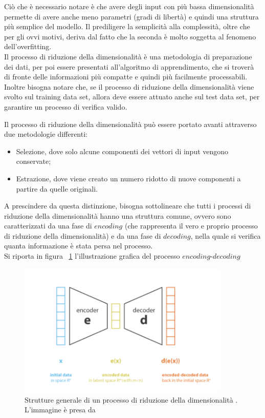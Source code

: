Ciò che è necessario notare è che avere degli input con più bassa dimensionalità permette di avere anche meno parametri (gradi di libertà) e quindi una struttura più semplice del modello. Il prediligere la semplicità alla complessità, oltre che per gli ovvi motivi, deriva dal fatto che la seconda è molto soggetta al fenomeno dell'overfitting. \\
Il processo di riduzione della dimensionalità è una metodologia di preparazione dei dati, per poi essere presentati all'algoritmo di apprendimento, che si troverà di fronte delle informazioni più compatte e quindi più facilmente processabili. \\
Inoltre bisogna notare che, se il processo di riduzione della dimensionalità viene svolto sul training data set, allora deve essere attuato anche sul test data set, per garantire un processo di verifica valido.
\newpage

Il processo di riduzione della dimensionalità può essere portato avanti attraverso due metodologie differenti:
\begin{itemize}
	\item Selezione, dove solo alcune componenti dei vettori di input vengono conservate;
	\item Estrazione, dove viene creato un numero ridotto di nuove componenti a partire da quelle originali.
\end{itemize}
A prescindere da questa distinzione, bisogna sottolineare che tutti i processi di riduzione della dimensionalità hanno una struttura comune, ovvero sono caratterizzati da una fase di $\textit{encoding}$ (che rappresenta il vero e proprio processo di riduzione della dimensionalità) e da una fase di $\textit{decoding}$, nella quale si verifica quanta informazione è stata persa nel processo. \\ 
Si riporta in figura ~\ref{encoder-decoder} l'illustrazione grafica del processo $\textit{encoding-decoding}$
\begin{figure}[h!]
	\centering
	\includegraphics[width=0.90\textwidth]{figs/encoder-decoder.png}
	\caption{Strutture generale di un processo di riduzione della dimensionalità . L'immagine è presa da \cite{Understanding_VAEs}}
	\label{encoder-decoder}
\end{figure}

